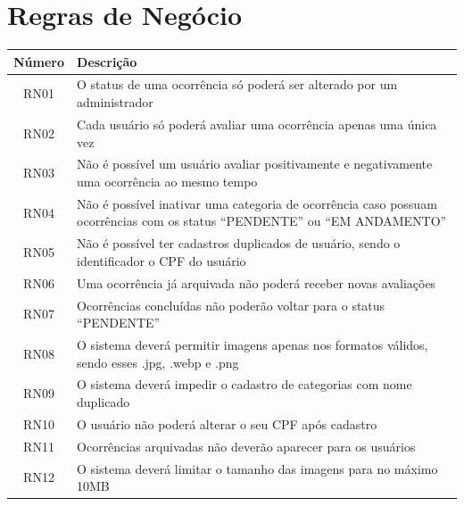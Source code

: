 
\chapter{Regras de Negócio}
\begin{quadro}[htb]
	\caption{\label{regras_negocio}Regras de Negócio}
	\begin{tabular}{|c|>{\centering\arraybackslash}m{11cm}|}
		\hline
		\textbf{Número} & \textbf{Descrição}\\ \hline
		RN01 & O status de uma ocorrência só poderá ser alterado por um administrador \\ \hline
		RN02 & Cada usuário só poderá avaliar uma ocorrência apenas uma única vez \\ \hline
		RN03 & Não é possível um usuário avaliar positivamente e negativamente uma ocorrência ao mesmo tempo \\ \hline
		RN04 & Não é possível inativar uma categoria de ocorrência caso possuam ocorrências com os status ``PENDENTE'' ou ``EM ANDAMENTO'' \\ \hline
		RN05 & Não é possível ter cadastros duplicados de usuário, sendo o identificador o CPF do usuário \\ \hline
		RN06 & Uma ocorrência já arquivada não poderá receber novas avaliações \\ \hline
		RN07 & Ocorrências concluídas não poderão voltar para o status ``PENDENTE'' \\ \hline
		RN08 & O sistema deverá permitir imagens apenas nos formatos válidos, sendo esses .jpg, .webp e .png \\ \hline
		RN09 & O sistema deverá impedir o cadastro de categorias com nome duplicado \\ \hline
		RN10 & O usuário não poderá alterar o seu CPF após cadastro \\ \hline
		RN11 & Ocorrências arquivadas não deverão aparecer para os usuários \\ \hline
		RN12 & O sistema deverá limitar o tamanho das imagens para no máximo 10MB \\ \hline
	\end{tabular}
\end{quadro}
